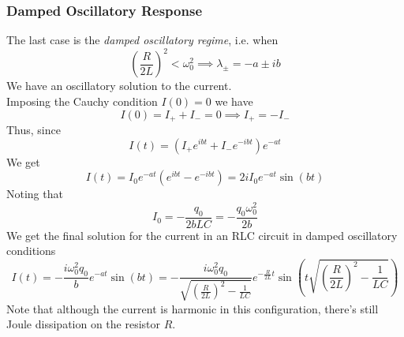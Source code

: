 \documentclass[../electromagnetism.tex]{subfiles}
\begin{document}
\subsubsection{Damped Oscillatory Response}
The last case is the \textit{damped oscillatory regime}, i.e. when
\begin{equation*}
	\left( \frac{R}{2L} \right)^2<\omega_0^2\implies \lambda_{\pm}=-a\pm ib
\end{equation*}
We have an oscillatory solution to the current.\\
Imposing the Cauchy condition $I(0)=0$ we have
\begin{equation*}
	I(0)=I_{+}+I_{-}=0\implies I_{+}=-I_{-}
\end{equation*}
Thus, since
\begin{equation*}
	I(t)=\left( I_{+}e^{ibt}+I_{-}e^{-ibt} \right)e^{-at}
\end{equation*}
We get
\begin{equation*}
	I(t)=I_0e^{-at}\left( e^{ibt}-e^{-ibt}\right)=2i I_0e^{-at}\sin(bt)
\end{equation*}
Noting that
\begin{equation*}
	I_0=-\frac{q_0}{2bLC}=-\frac{q_0\omega_0^2}{2b}
\end{equation*}
We get the final solution for the current in an RLC circuit in damped oscillatory conditions
\begin{equation}
	I(t)=-\frac{i\omega_0^2q_0}{b}e^{-at}\sin\left( bt \right)=-\frac{i\omega_0^2q_0}{\sqrt{\left( \frac{R}{2L} \right)^2-\frac{1}{LC}}}e^{-\frac{R}{2L}t}\sin\left( t\sqrt{\left( \frac{R}{2L} \right)^2-\frac{1}{LC}} \right)
	\label{eq:oscillatorydampedI.rlc}
\end{equation}
Note that although the current is harmonic in this configuration, there's still Joule dissipation on the resistor $R$.
\end{document}
